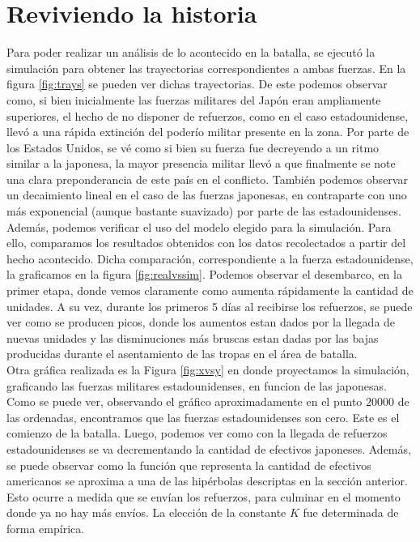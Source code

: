 \documentclass{sig-alternate}
\begin{document}
\section{Reviviendo la historia}

Para poder realizar un análisis de lo acontecido en la batalla, se ejecutó la simulación para obtener las 
trayectorias correspondientes a ambas fuerzas. En la figura \ref{fig:trays} se pueden ver dichas trayectorias. 
De este podemos observar como, si bien inicialmente las fuerzas militares del Japón eran ampliamente superiores, el hecho de no disponer de 
refuerzos, como en el caso estadounidense, llevó a una rápida extinción del poderío militar presente en la zona. Por parte de los 
Estados Unidos, se vé como si bien su fuerza fue decreyendo a un ritmo similar a la japonesa, la mayor presencia militar llevó a que finalmente
se note una clara preponderancia de este país en el conflicto. También podemos observar un decaimiento lineal en el caso de las fuerzas japonesas,
en contraparte con uno más exponencial (aunque bastante suavizado) por parte de las estadounidenses.\\
Además, podemos verificar el uso del modelo elegido para la simulación. Para ello, comparamos los resultados obtenidos con los datos 
recolectados a partir del hecho acontecido. Dicha comparación, correspondiente a la fuerza estadounidense, la graficamos en la figura 
\ref{fig:realvssim}.
Podemos observar el desembarco, en la primer etapa, donde vemos claramente como aumenta rápidamente la cantidad de unidades. A su vez, durante los primeros 5 días al recibirse los refuerzos, se
puede ver como se producen picos, donde los aumentos estan dados por la llegada de nuevas unidades y las disminuciones más bruscas estan dadas
por las bajas producidas durante el asentamiento de las tropas en el área de batalla.\\
Otra gráfica realizada es la Figura \ref{fig:xvsy} en donde proyectamos la simulación, graficando las fuerzas militares
estadounidenses, en funcion de las japonesas. Como se puede ver, observando el gráfico aproximadamente en el punto $20000$ de las ordenadas,
encontramos que las fuerzas estadounidenses son cero. Este es el comienzo de la batalla. Luego, podemos ver como con la llegada de refuerzos 
estadounidenses se va decrementando la cantidad de efectivos japoneses. Además, se puede observar como la función que representa la cantidad de
efectivos americanos se aproxima a una de las hipérbolas descriptas en la sección anterior. Esto ocurre a medida que se envían los refuerzos,
para culminar en el momento donde ya no hay más envíos. La elección de la constante $K$ fue determinada de forma empírica.
\end{document}
